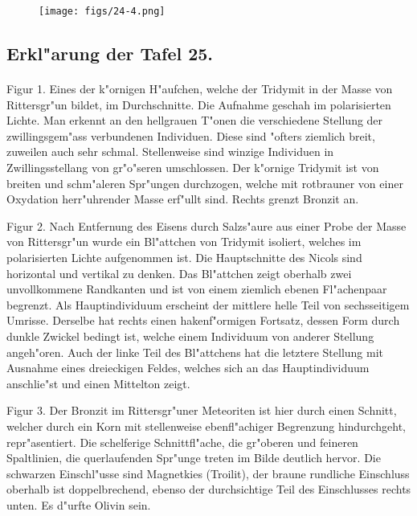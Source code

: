 \documentclass[a4paper, 11pt, oneside, polutonikogreek, german]{article}
\begin{document}
\vspace*{\fill}
\begin{figure}[H]
\centering
\texttt{[image: figs/24-4.png]}
\caption{}
\end{figure}
\vspace*{\fill}
\clearpage

\subsection{Erkl"arung der Tafel 25.}
\paragraph{}
Figur 1. Eines der k"ornigen H"aufchen, welche der Tridymit in der Masse von Rittersgr"un bildet, im Durchschnitte. Die Aufnahme geschah im polarisierten Lichte. Man erkennt an den hellgrauen T"onen die verschiedene Stellung der zwillingsgem"ass verbundenen Individuen. Diese sind "ofters ziemlich breit, zuweilen auch sehr schmal. Stellenweise sind winzige Individuen in Zwillingsstellang von gr"o"seren umschlossen. Der k"ornige Tridymit ist von breiten und schm"aleren Spr"ungen durchzogen, welche mit rotbrauner von einer Oxydation herr"uhrender Masse erf"ullt sind. Rechts grenzt Bronzit an.

Figur 2. Nach Entfernung des Eisens durch Salzs"aure aus einer Probe der Masse von Rittersgr"un wurde ein Bl"attchen von Tridymit isoliert, welches im polarisierten Lichte aufgenommen ist. Die Hauptschnitte des Nicols sind horizontal und vertikal zu denken. Das Bl"attchen zeigt oberhalb zwei unvollkommene Randkanten und ist von einem ziemlich ebenen Fl"achenpaar begrenzt. Als Hauptindividuum erscheint der mittlere helle Teil von sechsseitigem Umrisse. Derselbe hat rechts einen hakenf"ormigen Fortsatz, dessen Form durch dunkle Zwickel bedingt ist, welche einem Individuum von anderer Stellung angeh"oren. Auch der linke Teil des Bl"attchens hat die letztere Stellung mit Ausnahme eines dreieckigen Feldes, welches sich an das Hauptindividuum anschlie"st und einen Mittelton zeigt.

Figur 3. Der Bronzit im Rittersgr"uner Meteoriten ist hier durch einen Schnitt, welcher durch ein Korn mit stellenweise ebenfl"achiger Begrenzung hindurchgeht, repr"asentiert. Die schelferige Schnittfl"ache, die gr"oberen und feineren Spaltlinien, die querlaufenden Spr"unge treten im Bilde deutlich hervor. Die schwarzen Einschl"usse sind Magnetkies (Troilit), der braune rundliche Einschluss oberhalb ist doppelbrechend, ebenso der durchsichtige Teil des Einschlusses rechts unten. Es d"urfte Olivin sein.
\end{document}
